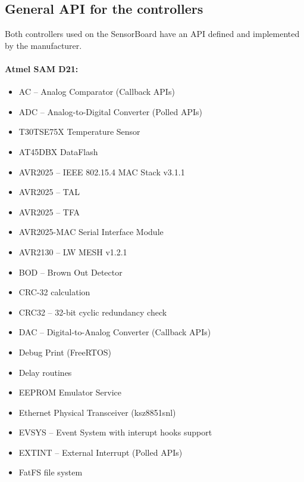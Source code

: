 \subsection{General \ac{API} for the controllers}
\label{GeneralAPI}
Both controllers used on the SensorBoard have an \ac{API} defined and implemented by the manufacturer.

\paragraph{Atmel SAM D21:} \cite{AtmelSAMd20API}
\begin{multicols}{2}
    \begin{flushleft}
        \begin{itemize}
            \setlength\itemsep{1pt}
            \item AC -- Analog Comparator (Callback \ac{API}s)
            \item ADC -- Analog-to-Digital Converter (Polled \ac{API}s)
            \item T30TSE75X Temperature Sensor
            \item AT45DBX DataFlash
            \item AVR2025 -- IEEE 802.15.4 MAC Stack v3.1.1
            \item AVR2025 -- TAL
            \item AVR2025 -- TFA
            \item AVR2025-MAC Serial Interface Module
            \item AVR2130 -- LW MESH v1.2.1
            \item BOD -- Brown Out Detector
            \item CRC-32 calculation
            \item CRC32 -- 32-bit cyclic redundancy check
            \item DAC -- Digital-to-Analog Converter (Callback \ac{API}s)
            \item Debug Print (FreeRTOS)
            \item Delay routines
            \item EEPROM Emulator Service
            \item Ethernet Physical Transceiver (ksz8851snl)
            \item EVSYS -- Event System with interupt hooks support
            \item EXTINT -- External Interrupt (Polled \ac{API}s)
            \item FatFS file system

\end{itemize}
\end{flushleft}
\end{multicols}
